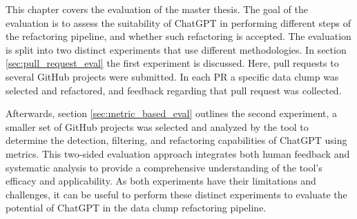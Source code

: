 This chapter covers the evaluation of the master thesis. The goal of the evaluation is to assess the suitability of ChatGPT in performing  different steps of the refactoring pipeline, and whether such refactoring is accepted. The evaluation is split into two distinct experiments that use different methodologies. 
In section \ref{sec:pull_request_eval} the  first experiment is discussed. Here, pull requests to several GitHub projects were submitted. In each PR  a specific data clump was selected and refactored, and feedback regarding that pull request was collected.

Afterwards, section \ref{sec:metric_based_eval} outlines  the second experiment, a smaller set of GitHub projects was selected and analyzed by the tool to determine the detection, filtering, and refactoring capabilities of ChatGPT using metrics.
This two-sided evaluation approach integrates both human feedback and systematic analysis to provide a comprehensive understanding of the tool's efficacy and applicability.  As both experiments have their limitations and challenges, it can be useful to perform these distinct experiments to evaluate the potential of ChatGPT in the data clump refactoring pipeline.











